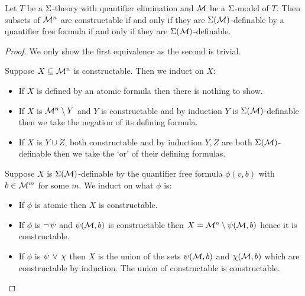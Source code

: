 \begin{prop}
    Let $T$ be a $\Sigma$-theory with quantifier elimination and 
    $\mathcal{M}$ be a $\Sigma$-model of $T$.
    Then subsets of $\mathcal{M}^n$ are constructable if and only if they are 
    $\Sigma(\mathcal{M})$-definable by a quantifier free formula if and only if they 
    are $\Sigma(\mathcal{M})$-definable.
\end{prop}
\begin{proof}
    We only show the first equivalence as the second is trivial.
    \begin{forward}
        Suppose $X \subseteq \mathcal{M}^n$ is constructable.
        Then we induct on $X$:
        \begin{itemize}
            \item If $X$ is defined by an atomic formula then 
                there is nothing to show.
            \item If $X$ is $\mathcal{M}^n \setminus Y$ and $Y$ is constructable and 
                by induction $Y$ is $\Sigma(\mathcal{M})$-definable 
                then we take the negation of its defining formula.
            \item If $X$ is $Y \cup Z$, both constructable and 
                by induction $Y,Z$ are both $\Sigma(\mathcal{M})$-definable 
                then we take the `or' of their defining formulas.
        \end{itemize}
    \end{forward}
    \begin{backward}
        Suppose $X$ is $\Sigma(\mathcal{M})$-definable by the quantifier free formula 
        $\phi(v,b)$ with $b \in \mathcal{M}^m$ for some $m$.
        We induct on what $\phi$ is:
        \begin{itemize}
            \item If $\phi$ is atomic then $X$ is constructable.
            \item If $\phi$ is $\neg\, \psi$ and $\psi(\mathcal{M},b)$
                is constructable then $X = \mathcal{M}^n \setminus \psi(\mathcal{M},b)$
                hence it is constructable.
            \item If $\phi$ is $\psi \, \lor \, \chi$ then $X$ is the union of 
                the sets $\psi(\mathcal{M},b)$ and $\chi(\mathcal{M},b)$ which are 
                constructable by induction. 
                The union of constructable is constructable.
        \end{itemize}
    \end{backward}
\end{proof}


